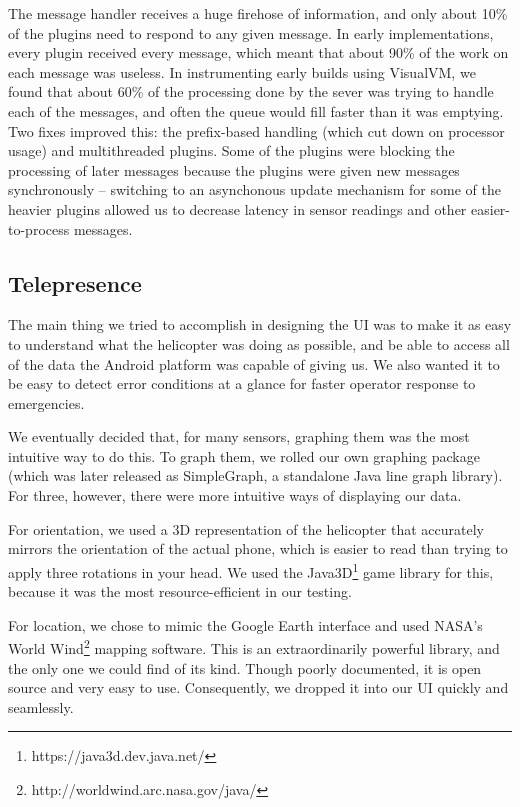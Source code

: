 The message handler receives a huge firehose of information, and only
about 10\% of the plugins need to respond to any given message. In
early implementations, every plugin received every message, which
meant that about 90\% of the work on each message was useless. In
instrumenting early builds using VisualVM, we found that about 60\% of
the processing done by the sever was trying to handle each of the
messages, and often the queue would fill faster than it was
emptying. Two fixes improved this: the prefix-based handling (which
cut down on processor usage) and multithreaded plugins. Some of the
plugins were blocking the processing of later messages because the
plugins were given new messages synchronously -- switching to an
asynchonous update mechanism for some of the heavier plugins allowed
us to decrease latency in sensor readings and other easier-to-process
messages.

\subsection{Telepresence}
The main thing we tried to accomplish in designing the UI was to make
it as easy to understand what the helicopter was doing as possible,
and be able to access all of the data the Android platform was capable
of giving us. We also wanted it to be easy to detect error conditions
at a glance for faster operator response to emergencies.

We eventually decided that, for many sensors, graphing them was the
most intuitive way to do this. To graph them, we rolled our own
graphing package (which was later released as SimpleGraph, a standalone
Java line graph library). For three, however, there were more
intuitive ways of displaying our data. 

For orientation, we used a 3D representation of the helicopter that
accurately mirrors the orientation of the actual phone, which is
easier to read than trying to apply three rotations in your head. We
used the Java3D\footnote{https://java3d.dev.java.net/} game library
for this, because it was the most resource-efficient in our testing. 

For location, we chose to mimic the Google Earth interface and used
NASA's World Wind\footnote{http://worldwind.arc.nasa.gov/java/}
mapping software. This is an extraordinarily powerful library, and the
only one we could find of its kind. Though poorly documented, it is open
source and very easy to use.  Consequently, we dropped it into our UI
quickly and seamlessly. 


